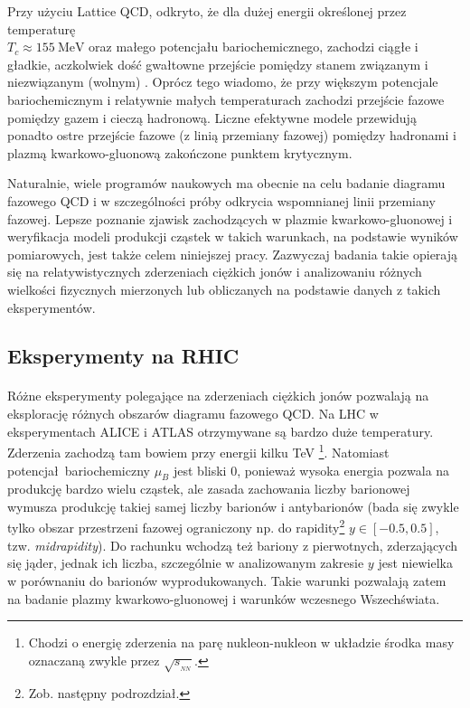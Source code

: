 \documentclass[a4paper,12pt]{article}
\begin{document}
Przy użyciu Lattice QCD, odkryto, że dla dużej energii określonej przez temperaturę \\ $T_c \approx 155~\text{MeV}$  oraz małego potencjału bariochemicznego, zachodzi ciągłe i gładkie, aczkolwiek dość gwałtowne przejście pomiędzy stanem związanym i niezwiązanym (wolnym) \cite{Aoki:2006we, Bazavov:2011nk, Andronic:2017pug}. Oprócz tego wiadomo, że przy większym potencjale bariochemicznym i relatywnie małych temperaturach zachodzi przejście fazowe pomiędzy gazem i cieczą hadronową. Liczne efektywne modele przewidują ponadto ostre przejście fazowe (z linią przemiany fazowej) pomiędzy hadronami i plazmą kwarkowo-gluonową zakończone punktem krytycznym. 

Naturalnie, wiele programów naukowych ma obecnie na celu badanie diagramu fazowego QCD i w szczególności próby odkrycia wspomnianej linii przemiany fazowej. Lepsze poznanie zjawisk zachodzących w plazmie kwarkowo-gluonowej i weryfikacja modeli produkcji cząstek w takich warunkach, na podstawie wyników pomiarowych, jest także celem niniejszej pracy. Zazwyczaj badania takie opierają się na relatywistycznych zderzeniach ciężkich jonów i analizowaniu różnych wielkości fizycznych mierzonych lub obliczanych na podstawie danych z takich eksperymentów.

\subsection{Eksperymenty na RHIC}
\paragraph{}
Różne eksperymenty polegające na zderzeniach ciężkich jonów pozwalają na eksplorację różnych obszarów diagramu fazowego QCD. Na LHC w eksperymentach ALICE i ATLAS otrzymywane są bardzo duże temperatury. Zderzenia zachodzą tam bowiem przy energii kilku \quad \quad \quad TeV \footnote{Chodzi o energię zderzenia na parę nukleon-nukleon w układzie środka masy oznaczaną zwykle przez  $\sqrt{s_{_{NN}}}$.}. Natomiast potencjał bariochemiczny $\mu_B$ jest bliski 0, ponieważ wysoka energia pozwala na produkcję bardzo wielu cząstek, ale zasada zachowania liczby barionowej wymusza produkcję takiej samej liczby barionów i antybarionów (bada się zwykle tylko obszar przestrzeni fazowej ograniczony np. do rapidity\footnote{Zob. następny podrozdział.} $y \in [-0.5, 0.5]$, tzw. \textit{midrapidity}). Do rachunku wchodzą też bariony z pierwotnych, zderzających się jąder, jednak ich liczba, szczególnie w analizowanym zakresie $y$ jest niewielka w porównaniu do barionów wyprodukowanych. Takie warunki pozwalają zatem na badanie plazmy kwarkowo-gluonowej i warunków wczesnego Wszechświata.
\end{document}
